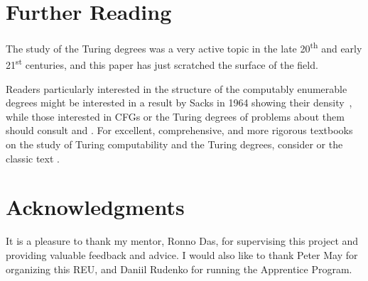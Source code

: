 \documentclass[psamsfonts]{amsart}
\newtheorem{thm}{Theorem}[section]
\theoremstyle{definition}
\theoremstyle{remark}
\numberwithin{equation}{section}
\begin{document}
\section{Further Reading}
The study of the Turing degrees was a very active topic in the late
20\textsuperscript{th} and early 21\textsuperscript{st} centuries, and this
paper has just scratched the surface of the field. \par
Readers particularly interested in the structure of the computably enumerable
degrees might be interested in a result by Sacks in 1964 showing their
density~\cite{sacks64:_recur_enumer_degrees_dense}, while those interested in
\aclp{CFG} or the Turing degrees of problems about them should consult \cite{REEDY197577} and
\cite{ginsburg66:_mathem_theor_contex_languag}
\cite{hopcroft07:_introd_autom_theor_languag_comput}. For excellent, comprehensive,
and more rigorous textbooks on the study of Turing computability and the Turing
degrees, consider \cite{soare16_turin_comput} \cite{lerman16:_degrees_unsol} or
the classic text \cite{kleene80_introd}.










\section*{Acknowledgments}
It is a pleasure to thank my mentor, Ronno Das, for supervising this project and
providing valuable feedback and advice. I would also like to thank Peter May for
organizing this REU, and Daniil Rudenko for running the Apprentice Program.

\printbibliography
\end{document}
